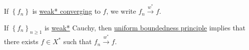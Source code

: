 \begin{notation}
	If \(\left\{ f_n \right\} \) is \hyperref[def:weak*-convergence]{weak* converging} to \(f\), we write \(f_n \overset{w^{\ast}}{\to } f\).
\end{notation}

\begin{definition}\label{def:weak*-topology}

\end{definition}

\begin{note}[Completeness]
	If \(\left\{ f_n \right\}_{n \geq 1}\) is \hyperref[def:weak*-convergence]{weak*} Cauchy, then \hyperref[thm:uniform-boundedness]{uniform boundedness principle} implies that there exists \(f\in X^{\ast} \) such that \(f_n \overset{w^{\ast} }{\to } f\).
\end{note}

